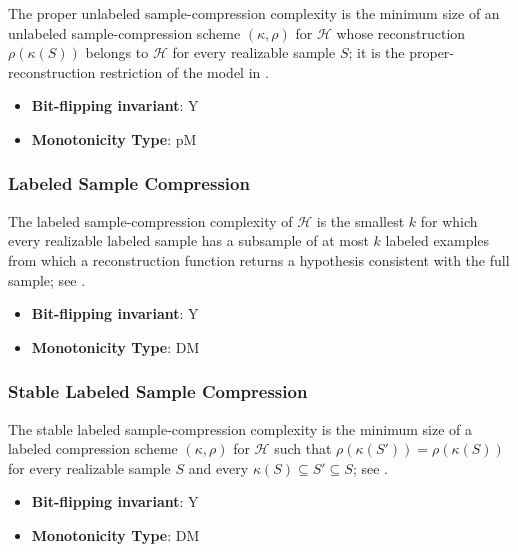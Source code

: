       \begin{definition}\label{def:proper_unlabeled_sample_compression}
      The proper unlabeled sample-compression complexity is the minimum size of an unlabeled sample-compression scheme $(\kappa,\rho)$ for $\mathcal H$ whose reconstruction $\rho(\kappa(S))$ belongs to $\mathcal H$ for every realizable sample $S$; it is the proper-reconstruction restriction of the model in \cite{kuzmin2007unlabeled,palvolgyi2021unlabeled,chalopin2022unlabeled}.
      \end{definition}
      \begin{itemize}
      \item {\bf Bit-flipping invariant}: Y
      \item {\bf Monotonicity Type}: pM
      \end{itemize}
\subsubsection{Labeled Sample Compression}
      
      \begin{definition}\label{def:labeled_sample_compression}
      The labeled sample-compression complexity of $\mathcal H$ is the smallest $k$ for which every realizable labeled sample has a subsample of at most $k$ labeled examples from which a reconstruction function returns a hypothesis consistent with the full sample; see \cite{FW1995}.
      \end{definition}
      \begin{itemize}
      \item {\bf Bit-flipping invariant}: Y
      \item {\bf Monotonicity Type}: DM
      \end{itemize}
\subsubsection{Stable Labeled Sample Compression}
      
      \begin{definition}\label{def:stable_labeled_sample_compression}
      The stable labeled sample-compression complexity is the minimum size of a labeled compression scheme $(\kappa,\rho)$ for $\mathcal H$ such that $\rho(\kappa(S'))=\rho(\kappa(S))$ for every realizable sample $S$ and every $\kappa(S)\subseteq S'\subseteq S$; see \cite{bousquet2020proper,hanneke2021stable}.
      \end{definition}
      \begin{itemize}
      \item {\bf Bit-flipping invariant}: Y
      \item {\bf Monotonicity Type}: DM
      \end{itemize}
